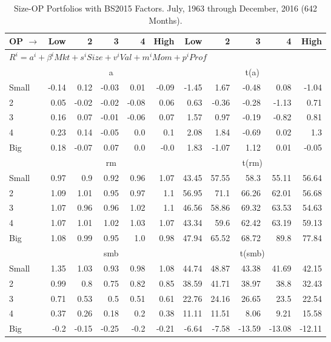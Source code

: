 
\begin{table}[!ht]
\centering
\caption{Size-OP Portfolios with BS2015 Factors. \footnotesize{July, 1963 through December, 2016 (642 Months).}}
\begin{tabular}{lrrrrrrrrrr}
  \toprule
  OP $\rightarrow$ & Low & 2 & 3 & 4 & High & Low & 2 & 3 & 4 & High \\ 
  \toprule
  \multicolumn{9}{l}{$R^i=a^i+\beta^iMkt+s^iSize+v^iVal+m^iMom+p^iProf$} \\

  

      & \multicolumn{5}{c}{a} & \multicolumn{5}{c}{t(a)} \\
    \cmidrule(r){2-6} \cmidrule(r){7-11}
      Small  & -0.14  & 0.12  & -0.03  & 0.01  & -0.09   & -1.45  & 1.67  & -0.48  & 0.08  & -1.04  \\
          2  & 0.05  & -0.02  & -0.02  & -0.08  & 0.06   & 0.63  & -0.36  & -0.28  & -1.13  & 0.71  \\
          3  & 0.16  & 0.07  & -0.01  & -0.06  & 0.07   & 1.57  & 0.97  & -0.19  & -0.82  & 0.81  \\
          4  & 0.23  & 0.14  & -0.05  & 0.0  & 0.1   & 2.08  & 1.84  & -0.69  & 0.02  & 1.3  \\
      Big    & 0.18  & -0.07  & 0.07  & 0.0  & -0.0   & 1.83  & -1.07  & 1.12  & 0.01  & -0.05  \\

  

      & \multicolumn{5}{c}{rm} & \multicolumn{5}{c}{t(rm)} \\
    \cmidrule(r){2-6} \cmidrule(r){7-11}
      Small  & 0.97  & 0.9  & 0.92  & 0.96  & 1.07   & 43.45  & 57.55  & 58.3  & 55.11  & 56.64  \\
          2  & 1.09  & 1.01  & 0.95  & 0.97  & 1.1   & 56.95  & 71.1  & 66.26  & 62.01  & 56.68  \\
          3  & 1.07  & 0.96  & 0.96  & 1.02  & 1.1   & 46.56  & 58.86  & 69.32  & 63.53  & 54.63  \\
          4  & 1.07  & 1.01  & 1.02  & 1.03  & 1.07   & 43.34  & 59.6  & 62.42  & 63.19  & 59.13  \\
      Big    & 1.08  & 0.99  & 0.95  & 1.0  & 0.98   & 47.94  & 65.52  & 68.72  & 89.8  & 77.84  \\

  

      & \multicolumn{5}{c}{smb} & \multicolumn{5}{c}{t(smb)} \\
    \cmidrule(r){2-6} \cmidrule(r){7-11}
      Small  & 1.35  & 1.03  & 0.93  & 0.98  & 1.08   & 44.74  & 48.87  & 43.38  & 41.69  & 42.15  \\
          2  & 0.99  & 0.8  & 0.75  & 0.82  & 0.85   & 38.59  & 41.71  & 38.97  & 38.8  & 32.43  \\
          3  & 0.71  & 0.53  & 0.5  & 0.51  & 0.61   & 22.76  & 24.16  & 26.65  & 23.5  & 22.54  \\
          4  & 0.37  & 0.26  & 0.18  & 0.2  & 0.38   & 11.11  & 11.51  & 8.06  & 9.21  & 15.58  \\
      Big    & -0.2  & -0.15  & -0.25  & -0.2  & -0.21   & -6.64  & -7.58  & -13.59  & -13.08  & -12.11  \\


\end{tabular}
\end{table}
